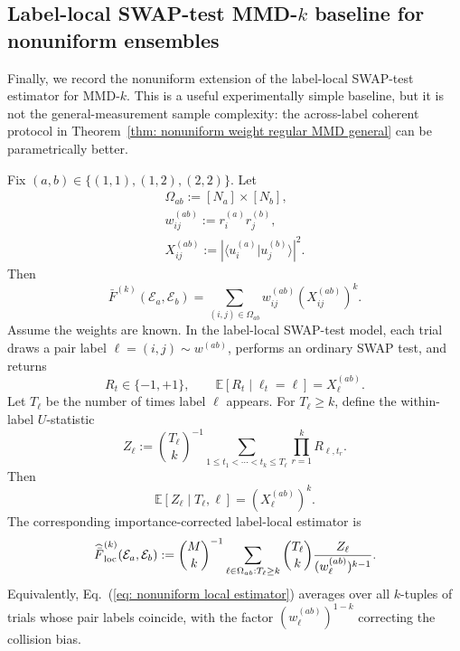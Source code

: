 \documentclass[aps,prx,reprint,superscriptaddress,amsmath,amssymb,longbibliography,floatfix]{revtex4-2}
\newcommand{\Abs}[1]{\left\lvert #1\right\rvert}
\providecommand{\braket}[2]{\langle #1|#2 \rangle}
\newcommand{\dsE}{\mathbb{E}}
\newcommand{\scE}{\mathcal{E}}
\theoremstyle{plain}
\theoremstyle{definition}
\theoremstyle{remark}
\begin{document}
\subsection{Label-local SWAP-test MMD-\(k\) baseline for nonuniform ensembles}

Finally, we record the nonuniform extension of the label-local SWAP-test estimator for MMD-\(k\). This is a useful experimentally simple baseline, but it is not the general-measurement sample complexity: the across-label coherent protocol in Theorem~\ref{thm: nonuniform weight regular MMD general} can be parametrically better.

Fix \((a,b)\in\{(1,1),(1,2),(2,2)\}\). Let
\[
\begin{gathered}
\Omega_{ab}:=[N_a]\times[N_b],
    \\
    w_{ij}^{(ab)}:=r_i^{(a)}r_j^{(b)},
    \\
    X_{ij}^{(ab)}
    :=
    \Abs{\braket{u_i^{(a)}}{u_j^{(b)}}}^2 .
\end{gathered}
\]
Then
\[
    \bar F^{(k)}(\scE_a,\scE_b)
    =
    \sum_{(i,j)\in\Omega_{ab}}
    w_{ij}^{(ab)}
    \left(X_{ij}^{(ab)}\right)^k .
\]
Assume the weights are known. In the label-local SWAP-test model, each trial draws a pair label \(\ell=(i,j)\sim w^{(ab)}\), performs an ordinary SWAP test, and returns
\[
    R_t\in\{-1,+1\},
    \qquad
    \dsE[R_t\mid \ell_t=\ell]=X_\ell^{(ab)} .
\]
Let \(T_\ell\) be the number of times label \(\ell\) appears. For \(T_\ell\ge k\), define the within-label \(U\)-statistic
\begin{equation}
    Z_\ell
    :=
    \binom{T_\ell}{k}^{-1}
    \sum_{1\le t_1<\cdots<t_k\le T_\ell}
    \prod_{r=1}^k R_{\ell,t_r}.
    \label{eq: nonuniform local U statistic}
\end{equation}
Then
\[
    \dsE[Z_\ell\mid T_\ell,\ell]
    =
    \left(X_\ell^{(ab)}\right)^k .
\]
The corresponding importance-corrected label-local estimator is
\begin{equation}
    \widehat{\bar F}^{(k)}_{\rm loc}(\scE_a,\scE_b)
    :=
    \binom{M}{k}^{-1}
    \sum_{\ell\in\Omega_{ab}:T_\ell\ge k}
    \binom{T_\ell}{k}
    \frac{Z_\ell}{(w_\ell^{(ab)})^{k-1}} .
    \label{eq: nonuniform local estimator}
\end{equation}
Equivalently, Eq.~(\ref{eq: nonuniform local estimator}) averages over all \(k\)-tuples of trials whose pair labels coincide, with the factor \((w_\ell^{(ab)})^{1-k}\) correcting the collision bias.
\end{document}
